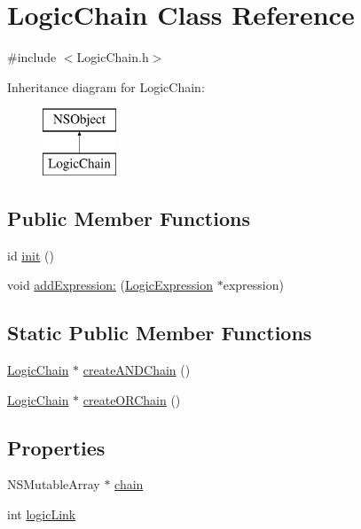 \hypertarget{interface_logic_chain}{
\section{\-Logic\-Chain \-Class \-Reference}
\label{interface_logic_chain}
}


{\ttfamily \#include $<$\-Logic\-Chain.\-h$>$}

\-Inheritance diagram for \-Logic\-Chain\-:\begin{figure}[H]
\begin{center}
\leavevmode
\includegraphics[height=2.000000cm]{interface_logic_chain}
\end{center}
\end{figure}
\subsection*{\-Public \-Member \-Functions}
\begin{DoxyCompactItemize}
\item 
id \hyperlink{interface_logic_chain_acfb21aa2a9108268a50f58e2e6807d02}{init} ()
\item 
void \hyperlink{interface_logic_chain_a25d4c0434149faf94ee508613e71945e}{add\-Expression\-:} (\hyperlink{interface_logic_expression}{\-Logic\-Expression} $\ast$expression)
\end{DoxyCompactItemize}
\subsection*{\-Static \-Public \-Member \-Functions}
\begin{DoxyCompactItemize}
\item 
\hyperlink{interface_logic_chain}{\-Logic\-Chain} $\ast$ \hyperlink{interface_logic_chain_a0463749d3459c1c680043392ff7bc185}{create\-A\-N\-D\-Chain} ()
\item 
\hyperlink{interface_logic_chain}{\-Logic\-Chain} $\ast$ \hyperlink{interface_logic_chain_a41442c8d77cbf064a8bcee9fa39ad738}{create\-O\-R\-Chain} ()
\end{DoxyCompactItemize}
\subsection*{\-Properties}
\begin{DoxyCompactItemize}
\item 
\-N\-S\-Mutable\-Array $\ast$ \hyperlink{interface_logic_chain_ad1259f02ddf13aab7310a0c64855d34b}{chain}
\item 
int \hyperlink{interface_logic_chain_a6a9b28d80359452f6204ea1c885db6ee}{logic\-Link}
\end{DoxyCompactItemize}


